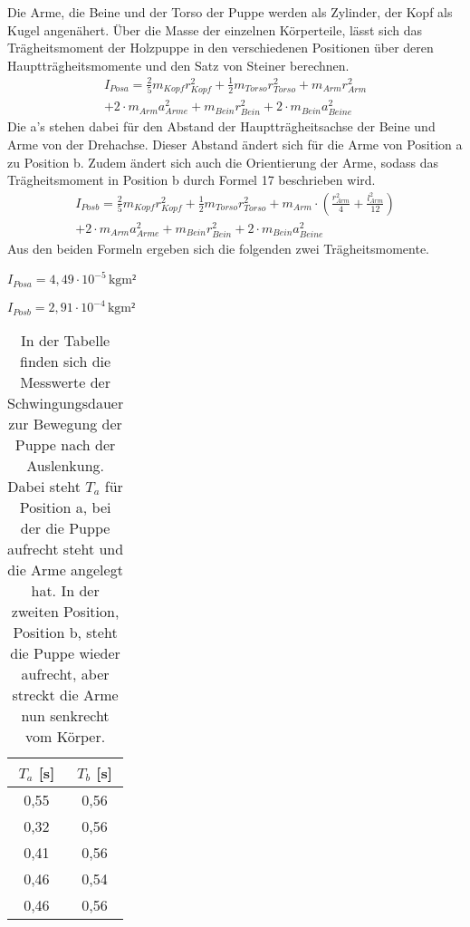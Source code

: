 \documentclass[titlepage = firstcover]{scrartcl}
\begin{document}
      Die Arme, die Beine und der Torso der Puppe werden als Zylinder, der Kopf als Kugel angenähert.
      Über die Masse der einzelnen Körperteile, lässt sich das Trägheitsmoment der Holzpuppe in den verschiedenen Positionen über deren Hauptträgheitsmomente und 
      den Satz von Steiner berechnen.
      \begin{equation}
        \begin{split}
          I_{Posa} = \frac{2}{5} m_{Kopf}r_{Kopf}^2 + \frac{1}{2} m_{Torso} r_{Torso}^2 + m_{Arm} r_{Arm}^2 \\
                    + 2 \cdot m_{Arm} a_{Arme}^2 + m_{Bein} r_{Bein}^2 + 2 \cdot m_{Bein} a_{Beine}^2
        \end{split}
      \end{equation}
      Die a's stehen dabei für den Abstand der Hauptträgheitsachse der Beine und Arme von der Drehachse. Dieser Abstand ändert sich für die Arme von Position a 
      zu Position b. Zudem ändert sich auch die Orientierung der Arme, sodass das Trägheitsmoment in Position b durch Formel 17 beschrieben wird. 
      \begin{equation}
        \begin{split}
          I_{Posb} = \frac{2}{5} m_{Kopf}r_{Kopf}^2 + \frac{1}{2} m_{Torso} r_{Torso}^2 + m_{Arm} \cdot (\frac{r_{Arm}^2}{4} + \frac{l_{Arm}^2}{12}) \\
                      + 2 \cdot m_{Arm} a_{Arme}^2 + m_{Bein} r_{Bein}^2 + 2 \cdot m_{Bein} a_{Beine}^2
        \end{split}
      \end{equation}
      Aus den beiden Formeln ergeben sich die folgenden zwei Trägheitsmomente.\newline
      
      $I_{Posa} = 4,49 \cdot 10^{-5} \, \text{kgm²}$ \newline
      
      $I_{Posb} = 2,91 \cdot 10^{-4} \, \text{kgm²}$
      \newpage
      \begin{table}[h]
        \centering
        \caption{In der Tabelle finden sich die Messwerte der Schwingungsdauer zur Bewegung der Puppe nach der Auslenkung. Dabei steht $T_a$ für Position a, bei der die Puppe aufrecht steht und die Arme angelegt hat. In der zweiten Position, Position b, steht die Puppe wieder aufrecht, aber streckt die Arme nun senkrecht vom Körper.}
        \label{tab:Tabelle_4}

        \begin{tabular}{c c}
          \toprule
          {$T_a$ [s]} & {$T_b$ [s]} \\
          \midrule
          0,55 & 0,56 \\
          0,32 & 0,56 \\
          0,41 & 0,56 \\ 
          0,46 & 0,54 \\
          0,46 & 0,56 \\
          \bottomrule
        \end{tabular}
      \end{table}  
      
\end{document}
